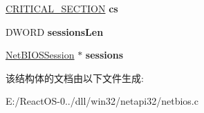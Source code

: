 \begin{DoxyCompactItemize}
\hyperlink{struct___c_r_i_t_i_c_a_l___s_e_c_t_i_o_n}{C\+R\+I\+T\+I\+C\+A\+L\+\_\+\+S\+E\+C\+T\+I\+ON} {\bfseries cs}
\item 
\mbox{\label{struct___net_b_i_o_s_adapter_a010ab347bbdb3e9c2cf39fb97f6dc0b8}} 
D\+W\+O\+RD {\bfseries sessions\+Len}
\item 
\mbox{\label{struct___net_b_i_o_s_adapter_ac2da61b49d7190ce2cf650fc7f57590e}} 
\hyperlink{struct___net_b_i_o_s_session}{Net\+B\+I\+O\+S\+Session} $\ast$ {\bfseries sessions}
\end{DoxyCompactItemize}


该结构体的文档由以下文件生成\+:\begin{DoxyCompactItemize}
\item 
E\+:/\+React\+O\+S-\/0../dll/win32/netapi32/netbios.\+c\end{DoxyCompactItemize}
